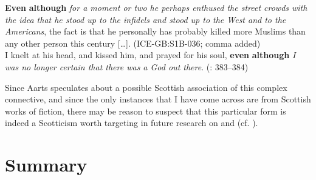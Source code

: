 \ea\label{ex:72}\label{bkm:Ref489448030}\textbf{Even} \textbf{although} \textit{for a moment or two he perhaps enthused the street crowds with the idea that he stood up to the infidels and stood up to the West and to the Americans}, the fact is that he personally has probably killed more Muslims than any other person this century […]. (ICE-GB:S1B-036; comma added)\\
\ex\label{ex:73}\label{bkm:Ref489448047}I knelt at his head, and kissed him, and prayed for his soul, \textbf{even} \textbf{although} \textit{I was no longer certain that there was a God out there}. (\citealt{May2012}: 383–384)\\
\z

Since Aarts speculates about a possible Scottish association of this complex connective, and since the only instances that I have come across are from Scottish works of fiction, there may be reason to suspect that this particular form is indeed a Scotticism worth targeting in future research on  and  (cf. \citealt{SchützlerEtAl2017}).

\section{Summary}\label{sec:3.6}

